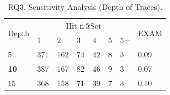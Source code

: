 
\begin{table}[t]
	\caption{RQ3. Sensitivity Analysis (Depth of Traces).}
        \vspace{-6pt}
	{\footnotesize
		\begin{center}
			\renewcommand{\arraystretch}{1}
			\begin{tabular}{p{1cm}|p{0.3cm}<{\centering}|p{0.3cm}<{\centering}|p{0.3cm}<{\centering}|p{0.3cm}<{\centering}|p{0.3cm}<{\centering}|p{0.3cm}<{\centering}|p{0.7cm}<{\centering}}
				\hline
				\multirow{2}{*}{Depth}    & \multicolumn{6}{c|}{Hit-n@Set}& \multirow{2}{*}{EXAM}\\
				\cline{2-7}
				&1&2&3&4&5&5+&\\
				
				\hline 
				5 			                & 371 & 162 & 74  & 42 & 8 & 3   & 0.09\\
			{\bf	10}                         & 387 & 167 & 82  & 46 & 9 & 3   & 0.07\\
				15	                        & 368 & 158 & 71  & 39 & 7 & 3   & 0.10\\
				\hline
			\end{tabular}
			
			\label{fig:rq3-2}
		\end{center}
	}
\end{table}


